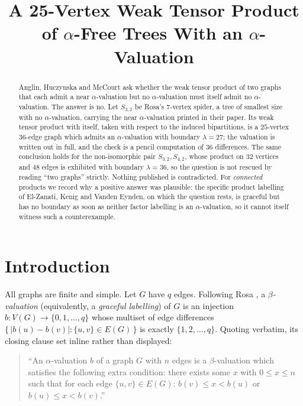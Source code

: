 \documentclass[11pt]{amsart}
\title[A weak tensor product of $\alpha$-free trees with an $\alpha$-valuation]
{A 25-Vertex Weak Tensor Product of $\alpha$-Free Trees With an $\alpha$-Valuation}
\date{}
\theoremstyle{definition}
\theoremstyle{remark}
\begin{document}
\begin{abstract}
Anglin, Huczynska and McCourt ask whether the weak tensor product of two graphs
that each admit a near $\alpha$-valuation but no $\alpha$-valuation must itself
admit no $\alpha$-valuation. The answer is no. Let $S_{3,2}$ be Rosa's
$7$-vertex spider, a tree of smallest size with no $\alpha$-valuation, carrying the
near $\alpha$-valuation printed in their paper. Its weak tensor product with
itself, taken with respect to the induced bipartitions, is a $25$-vertex
$36$-edge graph which admits an $\alpha$-valuation with boundary $\lambda=27$;
the valuation is written out in full, and the check is a pencil computation of
$36$ differences. The same conclusion holds for the non-isomorphic pair
$S_{3,2},S_{4,2}$, whose product on $32$ vertices and $48$ edges is exhibited
with boundary $\lambda=36$, so the question is not rescued by reading ``two
graphs'' strictly. Nothing published is contradicted. For \emph{connected}
products we record why a positive answer was plausible: the specific product
labelling of El-Zanati, Kenig and Vanden Eynden, on which the question rests,
is graceful but has no boundary as soon as neither factor labelling is an
$\alpha$-valuation, so it cannot itself witness such a counterexample.
\end{abstract}

\maketitle

\section{Introduction}

All graphs are finite and simple. Let $G$ have $q$ edges. Following Rosa
\cite{Rosa}, a \emph{$\beta$-valuation} (equivalently, a \emph{graceful
labelling}) of $G$ is an injection $b\colon V(G)\to\{0,1,\dots,q\}$ whose
multiset of edge differences $\{\,|b(u)-b(v)| : \{u,v\}\in E(G)\,\}$ is exactly
$\{1,2,\dots,q\}$. Quoting \cite{AHM} verbatim, its closing clause set inline
rather than displayed:

\begin{quote}
``An $\alpha$-valuation $b$ of a graph $G$ with $n$ edges is a
$\beta$-valuation which satisfies the following extra condition: there exists
some $x$ with $0\le x\le n$ such that for each edge $\{u,v\}\in E(G)$:
$b(v)\le x<b(u)$ or $b(u)\le x<b(v)$.''
\end{quote}
\end{document}

